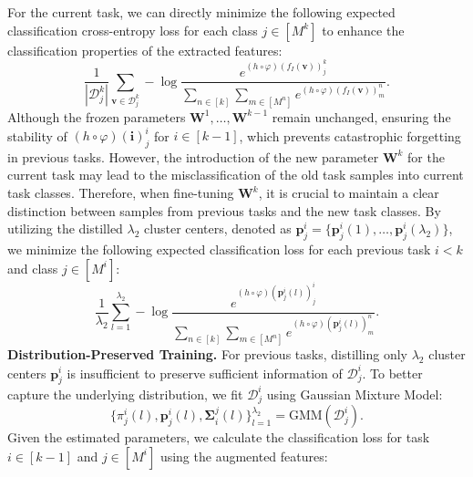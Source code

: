 \documentclass{article}
\theoremstyle{plain}
\theoremstyle{definition}
\theoremstyle{remark}
\begin{document}
For the current task, we can directly minimize the following expected classification cross-entropy loss for each class $j \in [M^{k}]$ to enhance the classification properties of the extracted features:
\begin{equation}
\label{eq7}
\frac{1}{|\mathcal{D}^{k}_{j}|} \sum_{\boldsymbol{v} \in \mathcal{D}^{k}_{j}} - \log \frac{e ^{ \left(h \circ \varphi\right)(f_{I} (\boldsymbol{v} ))^{k}_{j}}}{\sum\limits_{n \in [k]} \sum\limits_{m \in [M^{n}]} e^ { \left(h \circ \varphi\right)(f_{I} (\boldsymbol{v} ))_{m}^{n}}}.
\end{equation}
Although the frozen parameters $\boldsymbol{W}^1, \dots , \boldsymbol{W}^{k-1}$ remain unchanged, ensuring the stability of $\left(h \circ \varphi\right)(\boldsymbol{i})_{j}^{i}$ for $i \in [k-1]$, which prevents catastrophic forgetting in previous tasks. However, the introduction of the new parameter $\boldsymbol{W}^{k}$ for the current task may lead to the misclassification of the old task samples into current task classes.
Therefore, when fine-tuning $\boldsymbol{W}^{k}$, it is crucial to maintain a clear distinction between samples from previous tasks and the new task classes. By utilizing the distilled $\lambda_2$ cluster centers, denoted as $ \boldsymbol{p}_{j}^{i} = \{{\boldsymbol{p}_{j}^{i}(1), \dots , \boldsymbol{p}_{j}^{i} (\lambda_2)}\}$, we minimize the following expected classification loss for each previous task $i < k$ and class $j \in [M^{i}]$:
\begin{equation}
\label{eq8}
\frac{1}{\lambda_{2}} \sum_{l=1}^{\lambda_{2}}  - \log \frac{e ^{ \left(h \circ \varphi\right)(\boldsymbol{p}^{i}_{j}(l))_{j}^{i}}  }{\sum\limits_{n \in [k]} \sum\limits_{m \in [M^{n}]} e^ { \left(h \circ \varphi\right)(\boldsymbol{p}^{i}_{j} (l))_{m}^{n}}}.
\end{equation}
%
\textbf{Distribution-Preserved Training.} 
For previous tasks, distilling only $\lambda_2$ cluster centers $\boldsymbol{p}_{j}^{i}$ is insufficient to preserve sufficient information of $\mathcal{D}_{j}^{i}$. To better capture the underlying distribution, we fit $\mathcal{D}_{j}^{i}$ using Gaussian Mixture Model:
\begin{equation}
\{\pi_{j}^{i}(l), \boldsymbol{p}_{j}^{i} (l), \boldsymbol{\Sigma}_{i}^{j}(l) \}_{l=1}^{\lambda_{2}} = \mathrm{GMM} (\mathcal{D}_{j}^{i}).
\end{equation}
Given the estimated parameters, we calculate the classification loss for task $i \in [k-1]$ and $j \in [M^{i}]$ using the augmented features:
\end{document}
